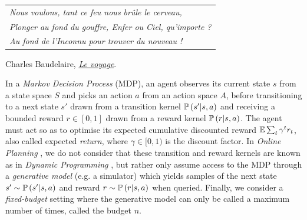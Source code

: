 
\graphicspath{{2-Chapters/6-Chapter/}}

\label{chapter:6}

\begin{flushright}
	\begin{tabular}{@{}l@{}}
		\emph{Nous voulons, tant ce feu nous brûle le cerveau,}\\
		\emph{Plonger au fond du gouffre, Enfer ou Ciel, qu’importe ?}\\
		\emph{Au fond de l’Inconnu pour trouver du nouveau !}\\
	\end{tabular}
	
	Charles Baudelaire, \href{https://eleurent.github.io/sisyphe/texts/le-voyage.html}{\emph{Le voyage}}.
\end{flushright}

\abstractStartChapter{}%

In a \emph{Markov Decision Process} (MDP), an agent observes its current state $s$ from a state space $S$ and picks an action $a$ from an action space $A$, before transitioning to a next state $s'$ drawn from a transition kernel $\mathbb{P}\left(s'|s,a\right)$ and receiving a bounded reward $r\in[0, 1]$ drawn from a reward kernel $\mathbb{P}\left(r|s, a\right)$. The agent must act so as to optimise its expected cumulative discounted reward $\operatorname*{\mathbb{E}} \sum_t \gamma^t r_t$, also called expected \emph{return}, where $\gamma\in[0,1)$ is the discount factor. In \emph{Online Planning} \cite{Munos2014}, we do not consider that these transition and reward kernels are known as in \emph{Dynamic Programming} \citep{Bellman1957}, but rather only assume access to the MDP through a \emph{generative model} (e.g. a simulator) which yields samples of the next state $s' \sim \mathbb{P}\left(s'|s,a\right)$ and reward $r\sim\mathbb{P}\left(r|s, a\right)$ when queried. Finally, we consider a \emph{fixed-budget} setting where the generative model can only be called a maximum number of times, called the budget $n$. 

\minitocStartChapter{}

